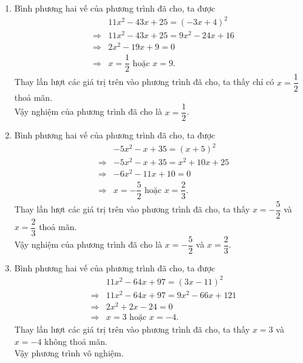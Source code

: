 \begin{bt}
{\begin{enumerate}
			Vậy phương trình vô nghiệm.
			\item Bình phương hai vế của phương trình đã cho, ta được
			\allowdisplaybreaks
			\begin{eqnarray*}
				&& 11x^2-43x+25=(-3x+4)^2\\
				& \Rightarrow& 11x^2-43x+25=9x^2-24x+16\\
				& \Rightarrow& 2x^2-19x+9=0\\
				& \Rightarrow& x=\dfrac{1}{2} \text{ hoặc }  x=9.
			\end{eqnarray*}
			Thay lần lượt các giá trị trên vào phương trình đã cho, ta thấy chỉ có $x=\dfrac{1}{2}$ thoả mãn.\\
			Vậy nghiệm của phương trình đã cho là $x=\dfrac{1}{2}$.
			\item Bình phương hai vế của phương trình đã cho, ta được
			\allowdisplaybreaks
			\begin{eqnarray*}
				&& -5x^2-x+35=(x+5)^2\\
				& \Rightarrow& -5x^2-x+35=x^2+10x+25\\
				& \Rightarrow& -6x^2-11x+10=0\\
				& \Rightarrow& x=-\dfrac{5}{2}  \text{ hoặc }  x=\dfrac{2}{3}.
			\end{eqnarray*}
			Thay lần lượt các giá trị trên vào phương trình đã cho, ta thấy $x=-\dfrac{5}{2}$ và $x=\dfrac{2}{3}$ thoả mãn.\\
			Vậy nghiệm của phương trình đã cho là $x=-\dfrac{5}{2}$ và $x=\dfrac{2}{3}$.
			\item Bình phương hai vế của phương trình đã cho, ta được
			\allowdisplaybreaks
			\begin{eqnarray*}
				&& 11x^2-64x+97=(3x-11)^2\\
				& \Rightarrow& 11x^2-64x+97=9x^2-66x+121\\
				& \Rightarrow& 2x^2+2x-24=0\\
				& \Rightarrow& x=3 \text{ hoặc }   x=-4.
			\end{eqnarray*}
			Thay lần lượt các giá trị trên vào phương trình đã cho, ta thấy $x=3$ và $x=-4$ không thoả mãn.\\
			Vậy phương trình vô nghiệm.
		\end{enumerate}
	}
\end{bt}

